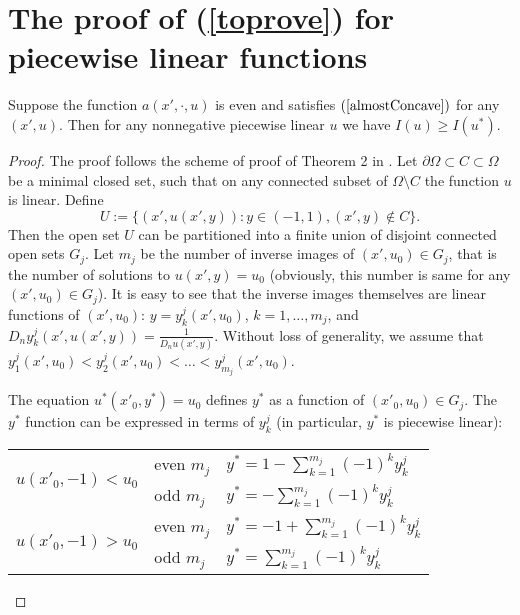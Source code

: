 \section{The proof of (\ref{toprove}) for piecewise linear functions}

\begin{lm}
Suppose the function $a(x', \cdot, u)$ is even and satisfies $(\ref{almostConcave})$ for any $(x', u)$.
Then for any nonnegative piecewise linear $u$ we have $I( u ) \ge I( u^* )$.
\end{lm}

\begin{proof}
The proof follows the scheme of proof of Theorem 2 in \cite{1dim}.
Let $\partial \Omega \subset C \subset \Omega$ be a minimal closed set, such that on any connected subset of $\Omega \setminus C$ the function $u$ is linear.
Define $$U := \{ ( x', u( x', y ) ): y \in (-1, 1), (x', y) \not\in C \}.$$
Then the open set $U$ can be partitioned into a finite union of disjoint connected open sets $G_j$.
Let $m_j$ be the number of inverse images of $( x', u_0 ) \in G_j$, that is the number of solutions to $u( x', y ) = u_0$
(obviously, this number is same for any $( x', u_0 ) \in G_j$).
It is easy to see that the inverse images themselves are linear functions of $( x', u_0 )$:
$y = y_k^j( x', u_0 )$, $k = 1, \dots, m_j$,
and $D_n y_k^j( x', u( x', y ) ) = \frac{1}{D_n u( x', y )}$.
Without loss of generality, we assume that $y_1^j(x', u_0) < y_2^j(x', u_0) < \ldots < y_{m_j}^j(x', u_0)$.

The equation $u^*(x'_0, y^*) = u_0$ defines $y^*$ as a function of $( x'_0, u_0 ) \in G_j$.
The $y^*$ function can be expressed in terms of $y_k^j$ (in particular, $y^*$ is piecewise linear):

\begin{center}
\begin{tabular}{l|l|l}
\multirow{2}{*}{$u( x'_0, -1 ) < u_0$ \rule[-34pt]{0pt}{65pt}} & even $m_j$ & $y^* = 1-\sum\limits_{k=1}^{m_j} (-1)^k y_k^j$ \rule[-17pt]{0pt}{40pt} \\
                                                               & odd $m_j$  & $y^* = -\sum\limits_{k=1}^{m_j} (-1)^k y_k^j$ \rule[-17pt]{0pt}{40pt} \\ \hline
\multirow{2}{*}{$u( x'_0, -1 ) > u_0$ \rule[-34pt]{0pt}{65pt}} & even $m_j$ & $y^* = -1+\sum\limits_{k=1}^{m_j} (-1)^k y_k^j$ \rule[-17pt]{0pt}{40pt} \\
                                                               & odd $m_j$  & $y^* = \sum\limits_{k=1}^{m_j} (-1)^k y_k^j$ \rule[-17pt]{0pt}{40pt} \\
\end{tabular}
\end{center}


\end{proof}
